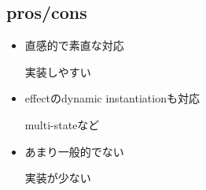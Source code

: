 \subsection*{pros/cons}
\begin{frame}
  \frametitlesubs

  \pause
  \begin{itemize}
    \item<+->[\coloremoji{😁}] 直感的で素直な対応

      実装しやすい
    \item<:->[\coloremoji{😁}] effectのdynamic instantiationも対応

      multi-stateなど
    \item<+->[\coloremoji{😅}] あまり一般的でない

      実装が少ない
  \end{itemize}
\end{frame}
